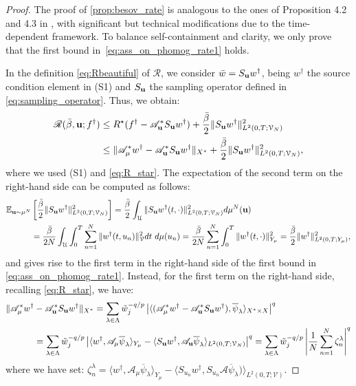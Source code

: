 \documentclass[11pt,a4paper]{article}
\numberwithin{equation}{section}
\newcommand{\msR}{\mathscr{R}}
\newcommand{\bu}{{\bf u}}
\newcommand{\cAbu}{\mathscr{A}_{\bu}}
\newcommand{\cA}{\mathscr{A}}
\newcommand{\cAm}{\mathscr{A}_\mu}
\newcommand{\Sbu}{S_{{\bu}}}
\newcommand{\E}{\mathbb{E}}
\begin{document}
\begin{proof}
The proof of  \cref{prop:besov_rate} is analogous to the ones of Proposition 4.2 and 4.3 in \cite{Bubba22}, with significant but technical modifications due to the time-dependent framework. To balance self-containment and clarity, we only prove that the first bound in~\eqref{eq:ass_on_phomog_rate1} holds.

    In the definition \eqref{eq:Rbeautiful} of $\msR$, we consider $\bar{w} = \Sbu w^\dag$, being $w^\dag$ the source condition element in (S1) and $\Sbu$ the sampling operator defined in \eqref{eq:sampling_operator}. Thus, we obtain:
\[
\begin{aligned}
    	\msR(\bar{\beta}, \bu; f^\dagger) &\leq
	R^\star(f^\dag - \cAbu^* \Sbu w^\dag) + \frac{\bar{\beta}}{2} \| \Sbu w^\dag \|^2_{L^2(0,T;\mathcal{V}_N)} \\
    & \leq 
    \| \cAm^*w^\dag - \cAbu^* \Sbu w^\dag \|_{X^*}
    + \frac{\bar{\beta}}{2} \| \Sbu w^\dag \|^2_{L^2(0,T;\mathcal{V}_N)},
\end{aligned}
\]
where we used (S1) and \eqref{eq:R_star}. 
The expectation of the second term on the right-hand side can be computed as follows:
\[
\begin{aligned}
    \E_{\bu \sim \mu^N} &\left[\frac{\bar{\beta}}{2} \| \Sbu w^\dag \|^2_{L^2(0,T;\mathcal{V}_N)}\right] = \frac{\bar{\beta}}{2} \int_{\mathcal{U}} \| \Sbu w^\dag(t,\cdot)\|^2_{L^2(0,T;\mathcal{V}_N)} d\mu^N(\bu) \\
    &=  \frac{\bar{\beta}}{2N} \int_{\mathcal{U}} \int_0^T \sum_{n=1}^N \| w^\dag(t,u_n)\|_{\mathcal{V}}^2 dt\ d\mu(u_n)
    =  \frac{\bar{\beta}}{2N} \sum_{n=1}^N  \int_0^T  \| w^\dag(t,\cdot) \|^2_{Y_\mu} = \frac{\bar{\beta}}{2} \| w^\dag\|_{L^2(0,T;Y_\mu)}^2,
\end{aligned}
\]
and gives rise to the first term in the right-hand side of the first bound in \eqref{eq:ass_on_phomog_rate1}. Instead, for the first term on the right-hand side, recalling \eqref{eq:R_star}, we have:
\begin{equation*}
    \begin{aligned}
    \| \cAm^*w^\dag & - \cAbu^* \Sbu w^\dag \|_{X^*} =
    \sum_{\lambda \in \Lambda} \tilde{w}_j^{-q/p} \left| \langle ( \cAm^*w^\dag - \cAbu^* \Sbu w^\dag ) , \overline{\psi}_\lambda \rangle_{X^* \times X} \right|^q \\
    &= \sum_{\lambda \in \Lambda} \tilde{w}_j^{-q/p} \left| \langle w^\dag, \cAm \overline{\psi}_\lambda \rangle_{Y_\mu} - \langle \Sbu w^\dag , \cAbu \overline{\psi}_\lambda \rangle_{L^2(0,T;\mathcal{V}_N)} \right|^q 
    = \sum_{\lambda \in \Lambda} \tilde{w}_j^{-q/p} \left| \frac{1}{N} \sum_{n = 1}^N \zeta_n^\lambda \right|^q 
    \end{aligned}
\end{equation*}
where we have set:
$\zeta^{\lambda}_n =  \langle w^\dag, \cAm \overline{\psi}_{\lambda} \rangle_{Y_\mu} - \langle S_{u_n} w^\dag, S_{u_n} \cA \overline{\psi}_\lambda) \rangle_{L^2(0,T;\mathcal{V})}$.


\end{proof}
\end{document}
